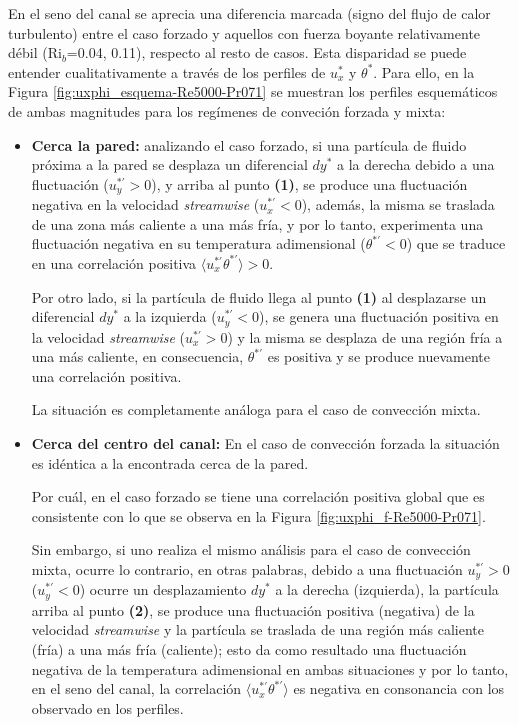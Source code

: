 En el seno del canal se aprecia una diferencia marcada (signo del flujo de calor turbulento) entre el caso forzado y aquellos con fuerza boyante relativamente débil (Ri$_b$=0.04, 0.11), respecto al resto de casos. Esta disparidad se puede entender cualitativamente a través de los perfiles de $u^*_x$ y $\theta^*$. Para ello, en la Figura \ref{fig:uxphi_esquema-Re5000-Pr071} se muestran los perfiles esquemáticos de ambas magnitudes para los regímenes de conveción forzada y mixta:

\begin{itemize}

\item \textbf{Cerca la pared:} analizando el caso forzado, si una partícula de fluido próxima a la pared se desplaza un diferencial $dy^*$ a la derecha debido a una fluctuación ($u^{* \prime}_y >0$), y arriba al punto \textbf{(1)}, se produce una fluctuación negativa en la velocidad \textit{streamwise} ($u^{* \prime}_x <0$), además, la misma se traslada de una zona más caliente a una más fría, y por lo tanto, experimenta una fluctuación negativa en su temperatura adimensional ($\theta^{* \prime}<0$) que se traduce en una correlación positiva $\langle u_x^{\ast \prime } \theta^{\ast \prime } \rangle > 0$. 

Por otro lado, si la partícula de fluido llega al punto \textbf {(1)} al desplazarse un diferencial $dy^*$ a la izquierda ($u^{* \prime}_y <0$), se genera una fluctuación positiva en la velocidad \textit{streamwise}  ($u^{* \prime}_x >0$) y la misma se desplaza de una región fría a una más caliente, en consecuencia, $\theta^{* \prime}$ es positiva y se produce nuevamente una correlación positiva.

La situación es completamente análoga para el caso de convección mixta.

\item \textbf{Cerca del centro del canal:} En el caso de convección forzada la situación es idéntica a la encontrada cerca de la pared.

Por cuál, en el caso forzado se tiene una correlación positiva global que es consistente con lo que se observa en la Figura \ref{fig:uxphi_f-Re5000-Pr071}. 

Sin embargo, si uno realiza el mismo análisis para el caso de convección mixta, ocurre lo contrario, en otras palabras, debido a una fluctuación $u^{* \prime}_y >0$ ($u^{* \prime}_y <0$) ocurre un desplazamiento $dy^*$ a la derecha (izquierda), la partícula arriba al punto \textbf{(2)}, se produce una fluctuación positiva (negativa) de la velocidad \textit{streamwise}  y la partícula se traslada de una región más caliente (fría) a una más fría (caliente); esto da como resultado una fluctuación negativa de la temperatura adimensional en ambas situaciones y por lo tanto, en el seno del canal, la correlación $\langle u_x^{\ast \prime } \theta^{\ast \prime } \rangle$ es negativa en consonancia con los observado en los perfiles.
\end{itemize}  

